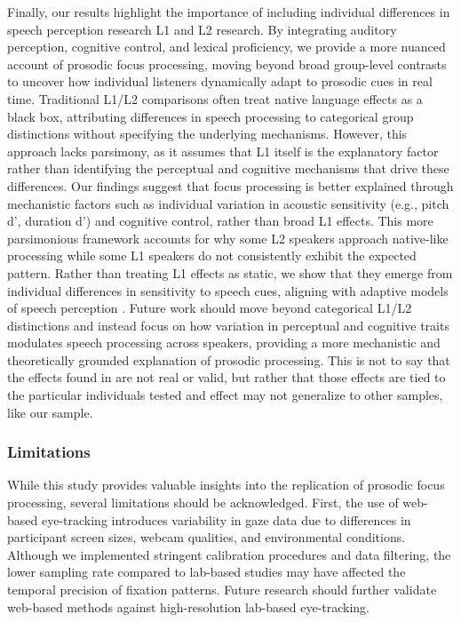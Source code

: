 Finally, our results highlight the importance of including individual differences in speech perception research L1 and L2 research. By integrating auditory perception, cognitive control, and lexical proficiency, we provide a more nuanced account of prosodic focus processing, moving beyond broad group-level contrasts to uncover how individual listeners dynamically adapt to prosodic cues in real time. Traditional L1/L2 comparisons often treat native language effects as a black box, attributing differences in speech processing to categorical group distinctions without specifying the underlying mechanisms. However, this approach lacks parsimony, as it assumes that L1 itself is the explanatory factor rather than identifying the perceptual and cognitive mechanisms that drive these differences. Our findings suggest that focus processing is better explained through mechanistic factors such as individual variation in acoustic sensitivity (e.g., pitch d$’$, duration d$’$) and cognitive control, rather than broad L1 effects. This more parsimonious framework accounts for why some L2 speakers approach native-like processing while some L1 speakers do not consistently exhibit the expected pattern. Rather than treating L1 effects as static, we show that they emerge from individual differences in sensitivity to speech cues, aligning with adaptive models of speech perception \citep{xie2023adaptive}. Future work should move beyond categorical L1/L2 distinctions and instead focus on how variation in perceptual and cognitive traits modulates speech processing across speakers, providing a more mechanistic and theoretically grounded explanation of prosodic processing. This is not to say that the effects found in \cite{Ge2021} are not real or valid, but rather that those effects are tied to the particular individuals tested and effect may not generalize to other samples, like our sample.


\subsubsection{Limitations}

While this study provides valuable insights into the replication of prosodic focus processing, several limitations should be acknowledged. First, the use of web-based eye-tracking introduces variability in gaze data due to differences in participant screen sizes, webcam qualities, and environmental conditions. Although we implemented stringent calibration procedures and data filtering, the lower sampling rate compared to lab-based studies may have affected the temporal precision of fixation patterns. Future research should further validate web-based methods against high-resolution lab-based eye-tracking.

